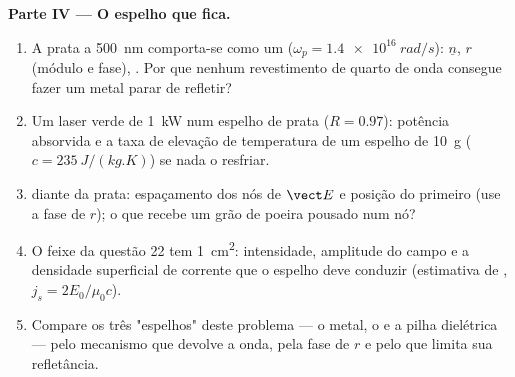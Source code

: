 \begin{problem}
\medskip
\noindent\textbf{Parte IV --- O espelho que fica.}
\begin{enumerate}[resume]
  \item A prata a \qty{500}{nm} comporta-se como um  ($\omega_p = \qty{1.4e16}{rad/s}$):
        $\underline n$, $r$ (módulo e fase), . Por que nenhum
        revestimento de quarto de onda consegue fazer um metal parar de refletir?
  \item Um laser verde de \qty{1}{kW} num espelho de prata ($R = 0.97$): potência
        absorvida e a taxa de elevação de temperatura de um espelho de \qty{10}{g}
        ($c = \qty{235}{J/(kg.K)}$) se nada o resfriar.
  \item {} diante da prata: espaçamento dos nós de
        $\vect E$ e posição do primeiro (use a fase de $r$);
        o que recebe um grão de poeira pousado num nó?
  \item O feixe da questão 22 tem \qty{1}{cm^2}: intensidade, amplitude
        do campo e a densidade superficial de corrente que o espelho deve
        conduzir (estimativa de , $j_s = 2E_0/\mu_0c$).
  \item Compare os três "espelhos" deste problema --- o metal, o
         e a pilha dielétrica --- pelo mecanismo que devolve
        a onda, pela fase de $r$ e pelo que limita sua
        refletância.
\end{enumerate}
\end{problem}
